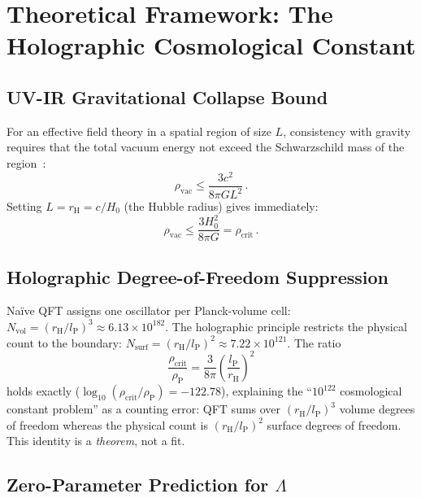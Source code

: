 \documentclass[12pt,a4paper]{article}
\newcommand{\lP}{l_\mathrm{P}}
\newcommand{\rH}{r_\mathrm{H}}
\newcommand{\rhocrit}{\rho_\mathrm{crit}}
\newcommand{\rhoP}{\rho_\mathrm{P}}
\begin{document}
\section{Theoretical Framework: The Holographic Cosmological Constant}

\subsection{UV-IR Gravitational Collapse Bound}

For an effective field theory in a spatial region of size $L$, consistency
with gravity requires that the total vacuum energy not exceed the Schwarzschild
mass of the region~\cite{Cohen1999}:
\begin{equation}
\rho_\mathrm{vac} \leq \frac{3c^2}{8\pi G L^2}\,.
\label{eq:ckn}
\end{equation}
Setting $L = \rH = c/H_0$ (the Hubble radius) gives immediately:
\begin{equation}
\rho_\mathrm{vac} \leq \frac{3H_0^2}{8\pi G} = \rhocrit\,.
\label{eq:rho_crit}
\end{equation}

\subsection{Holographic Degree-of-Freedom Suppression}

Naïve QFT assigns one oscillator per Planck-volume cell:
$N_\mathrm{vol} = (\rH/\lP)^3 \approx 6.13\times 10^{182}$.
The holographic principle restricts the physical count to the boundary:
$N_\mathrm{surf} = (\rH/\lP)^2 \approx 7.22\times 10^{121}$.
The ratio
\begin{equation}
\frac{\rhocrit}{\rhoP} = \frac{3}{8\pi}\left(\frac{\lP}{\rH}\right)^{\!2}
\label{eq:identity}
\end{equation}
holds exactly ($\log_{10}(\rhocrit/\rhoP) = -122.78$), explaining the
``$10^{122}$ cosmological constant problem'' as a counting error:
QFT sums over $(\rH/\lP)^3$ volume degrees of freedom whereas the physical
count is $(\rH/\lP)^2$ surface degrees of freedom.
This identity is a \emph{theorem}, not a fit.

\subsection{Zero-Parameter Prediction for $\Lambda$}
\end{document}
